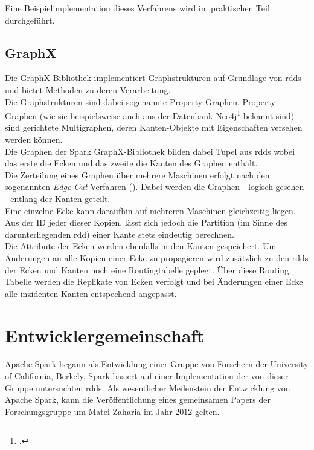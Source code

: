 Eine Beispielimplementation dieses Verfahrens wird im praktischen Teil durchgeführt.

\subsection{GraphX}
Die GraphX Bibliothek implementiert Graphstrukturen auf Grundlage von \glspl{rdd} und bietet Methoden zu deren Verarbeitung.\\

Die Graphstrukturen sind dabei sogenannte Property-Graphen. Property-Graphen (wie sie beispielsweise auch aus der Datenbank Neo4j\footcite{http://neo4j.com/, abgerufen am 16.06.2015} bekannt sind) sind gerichtete Multigraphen, deren Kanten-Objekte mit Eigenschaften versehen werden können.\\

Die Graphen der Spark GraphX-Bibliothek bilden dabei Tupel aus \glspl{rdd} wobei das erste die Ecken und das zweite die Kanten des Graphen enthält.\\

Die Zerteilung eines Graphen über mehrere Maschinen erfolgt nach dem sogenannten \textit{Edge Cut} Verfahren (\cite{Gonzalez:2014:GGP:2685048.2685096}). Dabei werden die Graphen - logisch gesehen - entlang der Kanten geteilt.\\

Eine einzelne Ecke kann daraufhin auf mehreren Maschinen gleichzeitig liegen. Aus der ID jeder dieser Kopien, lässt sich jedoch die Partition (im Sinne des darunterliegenden \gls{rdd}) einer Kante stets eindeutig berechnen.\\

Die Attribute der Ecken werden ebenfalls in den Kanten gespeichert. Um Änderungen an alle Kopien einer Ecke zu propagieren wird zusätzlich zu den \glspl{rdd} der Ecken und Kanten noch eine Routingtabelle geplegt. Über diese Routing Tabelle werden die Replikate von Ecken verfolgt und bei Änderungen einer Ecke alle inzidenten Kanten entspechend angepasst.\\

\section{Entwicklergemeinschaft}

Apache Spark begann als Entwicklung einer Gruppe von Forschern der University of California, Berkely. Spark basiert auf einer Implementation der von dieser Gruppe untersuchten \glspl{rdd}\cite{Mat12}. Als wesentlicher Meilenstein der Entwicklung von Apache Spark, kann die Veröffentlichung eines gemeinsamen Papers der Forschungsgruppe um Matei Zaharia im Jahr 2012 gelten.\\

